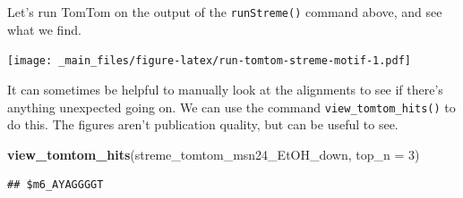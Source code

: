 \documentclass[
]{book}
\newenvironment{Shaded}{\begin{snugshade}}{\end{snugshade}}
\newcommand{\AttributeTok}[1]{\textcolor[rgb]{0.13,0.29,0.53}{#1}}
\newcommand{\CommentTok}[1]{\textcolor[rgb]{0.56,0.35,0.01}{\textit{#1}}}
\newcommand{\ConstantTok}[1]{\textcolor[rgb]{0.56,0.35,0.01}{#1}}
\newcommand{\DecValTok}[1]{\textcolor[rgb]{0.00,0.00,0.81}{#1}}
\newcommand{\FloatTok}[1]{\textcolor[rgb]{0.00,0.00,0.81}{#1}}
\newcommand{\FunctionTok}[1]{\textcolor[rgb]{0.13,0.29,0.53}{\textbf{#1}}}
\newcommand{\NormalTok}[1]{#1}
\newcommand{\OtherTok}[1]{\textcolor[rgb]{0.56,0.35,0.01}{#1}}
\newcommand{\SpecialCharTok}[1]{\textcolor[rgb]{0.81,0.36,0.00}{\textbf{#1}}}
\newcommand{\StringTok}[1]{\textcolor[rgb]{0.31,0.60,0.02}{#1}}
\begin{document}
Let's run TomTom on the output of the \texttt{runStreme()} command above, and
see what we find.

\begin{Shaded}
\end{Shaded}

\texttt{[image: \_main\_files/figure-latex/run-tomtom-streme-motif-1.pdf]}

It can sometimes be helpful to manually look at the alignments to see if
there's anything unexpected going on. We can use the command
\texttt{view\_tomtom\_hits()} to do this. The figures aren't publication quality,
but can be useful to see.

\begin{Shaded}
\begin{Highlighting}[]
\FunctionTok{view\_tomtom\_hits}\NormalTok{(streme\_tomtom\_msn24\_EtOH\_down, }\AttributeTok{top\_n =} \DecValTok{3}\NormalTok{)}
\end{Highlighting}
\end{Shaded}

\begin{verbatim}
## $m6_AYAGGGGT
\end{verbatim}
\end{document}
